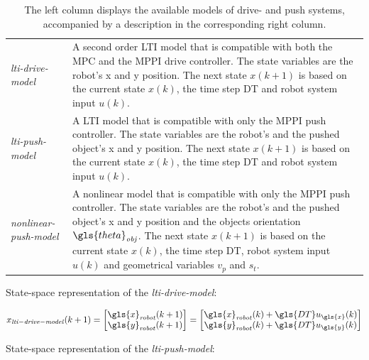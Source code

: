 \begin{table}[H]
\caption{The left column displays the available models of drive- and push systems, accompanied by a description in the corresponding right column.}\label{table:available_system_models}
\centering
\begin{tabular}%
  {>{\raggedright\arraybackslash}p{}%
   >{\raggedright\arraybackslash}p{}}
\textit{lti-drive-model} & A second order \ac{LTI} model that is compatible with both the \ac{MPC} and the \ac{MPPI} drive controller. The state variables are the robot's \gls{x} and \gls{y} position. The next state $x(k+1)$ is based on the current state $x(k)$, the time step \gls{DT} and robot system input $u(k)$.\\
\textit{lti-push-model} & A \ac{LTI} model that is compatible with only the \ac{MPPI} push controller. The state variables are the robot's and the pushed object's \gls{x} and \gls{y} position. The next state $x(k+1)$ is based on the current state $x(k)$, the time step \gls{DT} and robot system input $u(k)$.\\
\textit{nonlinear-push-model} & 
A nonlinear model that is compatible with only the \ac{MPPI} push controller. The state variables are the robot's and the pushed object's \gls{x} and \gls{y} position and the objects orientation $\gls{theta}_\mathit{obj}$. The next state $x(k+1)$ is based on the current state $x(k)$, the time step \gls{DT}, robot system input $u(k)$ and geometrical variables $v_p$ and $s_t$.\\
\end{tabular}
\end{table}

State-space representation of the \textit{lti-drive-model}:\bs

\begin{equation}
\label{eq:lti-drive-model}
x_{\mathit{lti-drive-model}}(k+1)=
\begin{bmatrix}
\gls{x}_\mathit{robot}(k+1)\\
\gls{y}_\mathit{robot}(k+1)
\end{bmatrix}
=
\begin{bmatrix}
\gls{x}_{\mathit{robot}}(k) + \gls{DT} u_{\gls{x}}(k)\\
\gls{y}_{\mathit{robot}}(k) + \gls{DT} u_{\gls{y}}(k)
\end{bmatrix}
\end{equation}

State-space representation of the \textit{lti-push-model}:\bs

